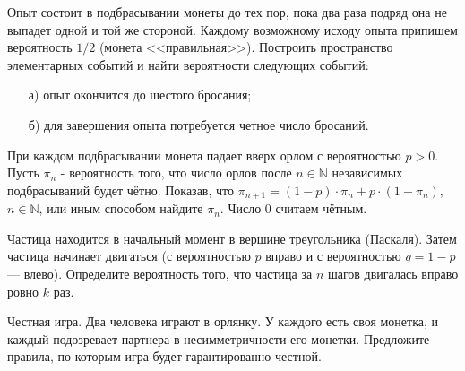 

\begin{problem}
Опыт состоит в подбрасывании монеты до тех пор, пока два раза подряд она не выпадет одной и той же стороной. Каждому 
возможному исходу опыта припишем вероятность $1/2$ (монета <<правильная>>). 
Построить пространство элементарных событий и найти вероятности следующих событий: 
\begin{enumerate}
\item[а)] опыт окончится до шестого бросания; 
\item[б)] для завершения опыта потребуется четное число бросаний. 
\end{enumerate}
\end{problem}


\begin{problem}
При каждом подбрасывании монета падает вверх орлом с вероятностью $p>0$. Пусть $\pi _{n} $ - вероятность того, что число орлов после $n\in {\mathbb N}$ независимых подбрасываний будет чётно. Показав, что $\pi _{n+1} =\left(1-p\right)\cdot \pi _{n} +p\cdot \left(1-\pi _{n} \right)$, $n\in {\mathbb N}$, или иным способом найдите $\pi _{n} $. Число $0$ считаем чётным.
\end{problem}

\begin{comment}
\begin{problem}
Симметричную монету независимо бросили $n$ раз. Результат бросания записали в виде последовательности нулей и единиц. Покажите, что с вероятностью стремящейся к единице при $n\to \infty $ длина максимальной подпоследовательности из подряд идущих единиц лежит в промежутке
\[\left(\log \sqrt{n} ,\; \log n^{2} \right).\] 
\end{problem}
\end{comment}

\begin{problem}
Частица находится в начальный момент в вершине треугольника (Паскаля). Затем частица начинает двигаться (с вероятностью $p$ вправо и 
с вероятностью $q = 1-p$ --- влево). Определите вероятность того, что частица за $n$ шагов 
двигалась вправо ровно $k$ раз. 
\end{problem}

\begin{problem}
Честная игра. Два человека играют в орлянку. У каждого есть своя монетка, и каждый подозревает партнера в несимметричности его монетки. Предложите правила, по которым игра будет гарантированно честной.
\end{problem}